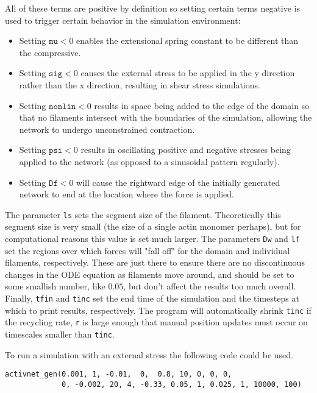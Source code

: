 All of these terms are positive by definition so setting certain terms negative is used to trigger certain behavior in the simulation environment:
\begin{itemize}
	\item  Setting $\texttt{mu} < 0$ enables the extensional spring constant to be different than the compressive.
	\item  Setting $\texttt{sig} < 0$ causes the external stress to be applied in the y direction rather than the x direction, resulting in shear stress simulations.
	\item Setting $\texttt{nonlin} < 0$ results in space being added to the edge of the domain so that no filaments intersect with the boundaries of the simulation, allowing the network to undergo unconstrained contraction.
	\item Setting $\texttt{psi} < 0$ results in oscillating positive and negative stresses being applied to the network (as opposed to a sinusoidal pattern regularly).
	\item Setting $\texttt{Df} < 0$ will cause the rightward edge of the initially generated network to end at the location where the force is applied.
\end{itemize}
   
The parameter \texttt{ls} sets the segment size of the filament.  Theoretically this segment size is very small (the size of a single actin monomer perhaps), but for computational reasons this value is set much larger.  The parameters \texttt{Dw} and \texttt{lf} set the regions over which forces will "fall off" for the domain and individual filaments, respectively.  These are just there to ensure there are no discontinuous changes in the ODE equation as filaments move around, and should be set to some smallish number, like $0.05$, but don't affect the results too much overall.  Finally, \texttt{tfin} and \texttt{tinc} set the end time of the simulation and the timesteps at which to print results, respectively.  The program will automatically shrink \texttt{tinc} if the recycling rate, \texttt{r} is large enough that manual position updates must occur on timescales smaller than \texttt{tinc}.


To run a simulation with an external stress the following code could be used.

\begin{verbatim}
activnet_gen(0.001, 1, -0.01,  0,  0.8, 10, 0, 0, 0, 
             0, -0.002, 20, 4, -0.33, 0.05, 1, 0.025, 1, 10000, 100)
\end{verbatim}


